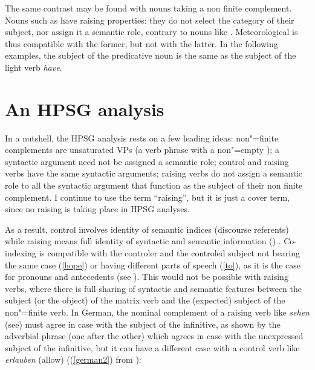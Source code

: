 \documentclass[output=paper
	        ,collection
	        ,collectionchapter
 	        ,biblatex
                ,babelshorthands
                ,newtxmath
                ,draftmode
                ,colorlinks, citecolor=brown
]{./langsci/langscibook}
\begin{document}
\eal
{}
\zl

The same contrast may be found with  nouns taking a non finite complement. Nouns such as  have raising properties: they do not select the category of their subject, nor assign it a semantic role, contrary to nouns like . Meteorological  is thus compatible with the former, but not with the latter. In the following examples, the subject of the predicative noun is the same as the subject of the light verb \emph{have}.


\eal
{}
\zl

\section{An HPSG analysis}


In a nutshell, the HPSG analysis rests on a few leading ideas: non"=finite complements are unsaturated VPs (a verb phrase with a non"=empty \subjl); a syntactic argument need not be assigned a semantic role; control and raising verbs have the same syntactic arguments; raising verbs do not assign a semantic role to all the syntactic argument that function as the subject of their non finite complement. I continue to use the term ``raising'', but it is just a cover term, since no raising is taking place in HPSG analyses.

As a result, control involves identity of semantic indices (discourse referents) while raising means full identity of syntactic and semantic information () . Co-indexing is compatible with the controler and the controled subject not bearing the same case (\ref{hope}) or having different parts of speech (\ref{to}), as it is the case for pronouns and antecedents (see ). This would not be possible with raising verbs, where there is full sharing of syntactic and semantic features between the subject (or the object) of the matrix verb and the (expected) subject of the non"=finite verb. In German, the nominal complement of a raising verb like \emph{sehen} (see) must agree in case with the subject of the infinitive, as shown by the adverbial phrase (one after the other) which agrees in case with the unexpressed subject of the infinitive, but it can have a different case with a control verb like \emph{erlauben} (allow) ((\ref{german2}) from ):
\end{document}
